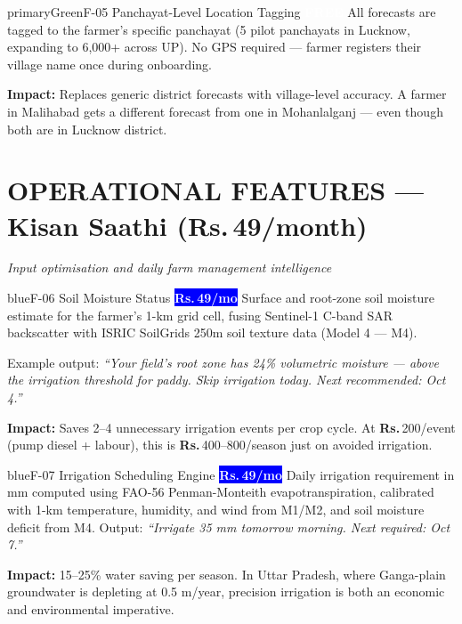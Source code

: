 \documentclass[12pt,a4paper]{article}
\newcommand{\Rup}{\textbf{Rs.\,}}
\newcommand{\freebadge}{\textcolor{white}{\colorbox{primaryGreen}{\footnotesize\textbf{FREE}}}}
\newcommand{\saathibadge}{\textcolor{white}{\colorbox{blue}{\footnotesize\textbf{\Rup49/mo}}}}
\begin{document}
\begin{featurebox}{primaryGreen}{F-05 \quad Panchayat-Level Location Tagging \quad \freebadge}
All forecasts are tagged to the farmer's specific panchayat (5 pilot panchayats in Lucknow, expanding to 6,000+ across UP). No GPS required --- farmer registers their village name once during onboarding.

\textbf{Impact:} Replaces generic district forecasts with village-level accuracy. A farmer in Malihabad gets a different forecast from one in Mohanlalganj --- even though both are in Lucknow district.
\end{featurebox}

\section{OPERATIONAL FEATURES --- Kisan Saathi (\Rup49/month)}
\textit{Input optimisation and daily farm management intelligence}

\begin{featurebox}{blue}{F-06 \quad Soil Moisture Status \quad \saathibadge}
Surface and root-zone soil moisture estimate for the farmer's 1-km grid cell, fusing Sentinel-1 C-band SAR backscatter with ISRIC SoilGrids 250m soil texture data (Model 4 --- M4).

Example output: \textit{``Your field's root zone has 24\% volumetric moisture --- above the irrigation threshold for paddy. Skip irrigation today. Next recommended: Oct 4.''}

\textbf{Impact:} Saves 2--4 unnecessary irrigation events per crop cycle. At \Rup200/event (pump diesel + labour), this is \Rup400--800/season just on avoided irrigation.
\end{featurebox}

\begin{featurebox}{blue}{F-07 \quad Irrigation Scheduling Engine \quad \saathibadge}
Daily irrigation requirement in mm computed using FAO-56 Penman-Monteith evapotranspiration, calibrated with 1-km temperature, humidity, and wind from M1/M2, and soil moisture deficit from M4. Output: \textit{``Irrigate 35 mm tomorrow morning. Next required: Oct 7.''}

\textbf{Impact:} 15--25\% water saving per season. In Uttar Pradesh, where Ganga-plain groundwater is depleting at 0.5 m/year, precision irrigation is both an economic and environmental imperative.
\end{featurebox}
\end{document}
